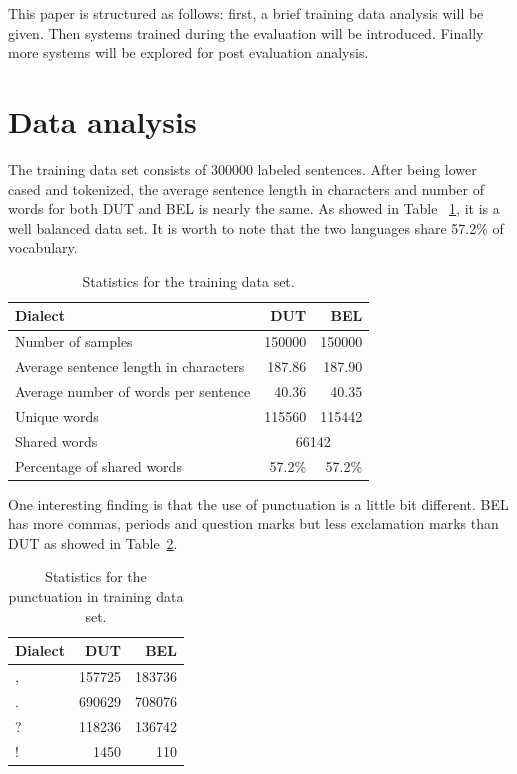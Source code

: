 \documentclass[11pt]{article}
\begin{document}
This paper is structured as follows: first, a brief training data analysis will be given. Then systems trained during the evaluation will be introduced. Finally more systems will be explored for post evaluation analysis.

\section{Data analysis}

The training data set consists of 300000 labeled sentences. After being lower cased and tokenized, the average sentence length in characters and number of words for both DUT and BEL is nearly the same. As showed in Table ~\ref{vocab}, it is a well balanced data set. It is worth to note that the two languages share 57.2\% of vocabulary.

 
\begin{table}[h]
	\centering
	
	
	\begin{tabular}{|l|r|r|}
		\hline
		
		Dialect & DUT & BEL \\ \hline
		Number of samples & 150000 & 150000  \\ \hline
		Average sentence length in characters & 187.86 & 187.90 \\ \hline
		Average number of words per sentence & 40.36 & 40.35 \\ \hline
		Unique words & 115560 & 115442 \\ \hline 
		Shared words & \multicolumn{2}{|c|}{66142}  \\ \hline
		Percentage of shared words & 57.2\% & 57.2\%  \\ \hline
	\end{tabular}
	\caption{Statistics for the training data set.}
	\label{vocab}
\end{table}

One interesting finding is that the use of punctuation is a little bit different. BEL has more commas, periods and question marks but less exclamation marks than DUT as showed in Table~\ref{punctuations}.

\begin{table}[h]
	\centering
	
	
	\begin{tabular}{|l|r|r|}
		\hline
		Dialect & DUT & BEL \\ \hline
		, & 157725 & 183736  \\ \hline
		. & 690629 & 708076 \\ \hline
		? & 118236 & 136742 \\ \hline
		! & 1450 & 110 \\ \hline 
	
	\end{tabular}
	\caption{Statistics for the punctuation in training data set.}
	\label{punctuations}
\end{table}
\end{document}
